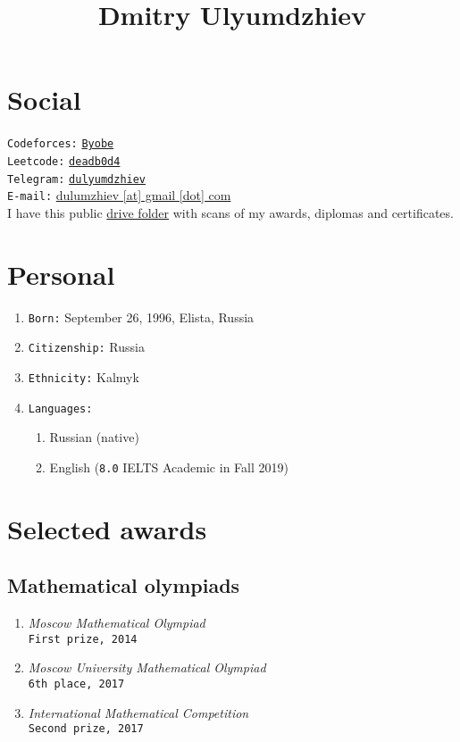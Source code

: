 \documentclass[twocolumn,10pt]{extarticle}
\title{Dmitry Ulyumdzhiev}
\date{}
\begin{document}
\maketitle

\balance

\thispagestyle{empty}

\section{Social}

\texttt{Codeforces:} \href{https://codeforces.com/profile/Byobe}{\texttt{Byobe}} \\
\texttt{Leetcode:} \href{https://leetcode.com/deadb0d4/}{\texttt{deadb0d4}} \\
\texttt{Telegram:} \href{https://t.me/dulyumdzhiev}{\texttt{dulyumdzhiev}} \\
\texttt{E-mail:} \href{mailto:dulumzhiev@gmail.com}{dulumzhiev [at] gmail [dot] com} \\

{I have this public \href{https://drive.google.com/drive/folders/1NT6w2IOH1FO1XDOfCJ9cktBSh_USbbWq?usp=sharing}{drive folder} with scans of my awards, diplomas and certificates.}

\section{Personal}

\begin{enumerate}
  \item \texttt{Born:} September 26, 1996, Elista, Russia
  \item \texttt{Citizenship:} Russia
  \item \texttt{Ethnicity:} Kalmyk
  \item \texttt{Languages:}
    \begin{enumerate}
      \item Russian (native)
      \item English (\texttt{8.0} IELTS Academic in Fall 2019)
    \end{enumerate}
\end{enumerate}

\section{Selected awards}

\subsection{Mathematical olympiads}
\begin{enumerate}
  \item \textit{Moscow Mathematical Olympiad} \\
    \quad \texttt{First prize, 2014}
  \item \textit{Moscow University Mathematical Olympiad} \\
    \quad \texttt{6th place, 2017}
  \item \textit{International Mathematical Competition} \\
    \quad \texttt{Second prize, 2017}
\end{enumerate}
\end{document}
